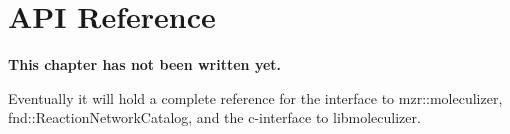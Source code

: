 \chapter {API Reference}
\label{chap:apiReference}

\bf{This chapter has not been written yet.}

Eventually it will hold a complete reference for the interface to
mzr::moleculizer, fnd::ReactionNetworkCatalog, and the c-interface to
libmoleculizer.



